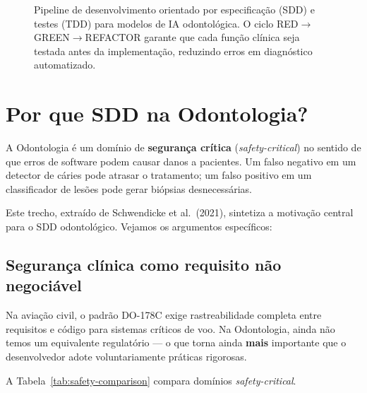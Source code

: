 \begin{figure}[H]
\caption{Pipeline de desenvolvimento orientado por especificação (SDD) e testes (TDD) para modelos de IA odontológica. O ciclo RED$\rightarrow$GREEN$\rightarrow$REFACTOR garante que cada função clínica seja testada antes da implementação, reduzindo erros em diagnóstico automatizado.}
\label{fig:sdd-tdd-pipeline}
\end{figure}


\section{Por que SDD na Odontologia?}

A Odontologia é um domínio de \textbf{segurança crítica} (\textit{safety-critical})
no sentido de que erros de software podem causar danos a pacientes. Um falso
negativo em um detector de cáries pode atrasar o tratamento; um falso positivo
em um classificador de lesões pode gerar biópsias desnecessárias.

 


Este trecho, extraído de Schwendicke et al.\ (2021), sintetiza a
motivação central para o SDD odontológico. Vejamos os argumentos
específicos:

\subsection{Segurança clínica como requisito não negociável}

Na aviação civil, o padrão DO-178C exige rastreabilidade completa entre
requisitos e código para sistemas críticos de voo. Na Odontologia, ainda
não temos um equivalente regulatório — o que torna ainda \textbf{mais}
importante que o desenvolvedor adote voluntariamente práticas rigorosas.

A Tabela~\ref{tab:safety-comparison} compara domínios \textit{safety-critical}.

